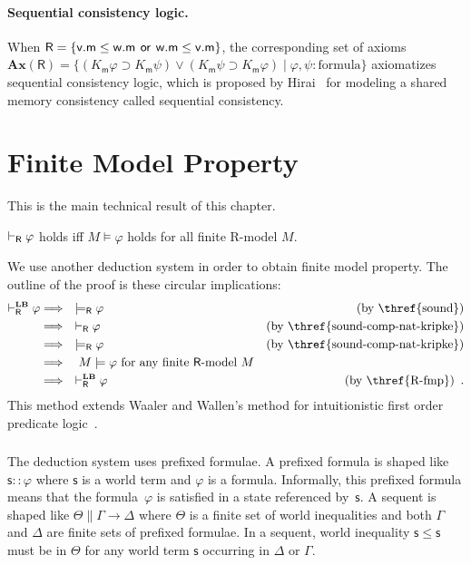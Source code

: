     \paragraph{Sequential consistency logic.}
    When $\mathsf R=\{\mathsf v.\mathsf m\le\mathsf w.\mathsf m\,\mathbin{\mathsf{or}}\, \mathsf
    w.\mathsf m\le \mathsf v.\mathsf m\}$,
    the corresponding set of axioms
    $\mathbf{Ax}(\mathsf R) = \{(K_{\mathsf m}\varphi\supset K_{\mathsf
    m}\psi)\vee(K_{\mathsf m}\psi\supset K_{\mathsf m}\varphi)\mid \varphi,
    \psi\colon\mbox{formula}\}$
    axiomatizes sequential consistency logic,
    which is proposed by Hirai~\cite{hirailpar} for modeling a shared memory consistency called sequential consistency.


  \section{Finite Model Property}
  \label{fmp-proof}

  This is the main technical result of this chapter.
  \begin{corollary}
   \label{thm:fmp}
   $\vdash_{\mathsf R}\varphi$ holds iff $M\models \varphi$ holds
   for all finite {\sf R}-model $M$.
  \end{corollary}

  We use another deduction system\,\LB\,in order to obtain finite model
  property.
  The outline of the proof is these circular implications:
  \begin{align*}
   \vdashRLB\varphi &\Longrightarrow \quad \models_{\mathsf R}\varphi\quad
   &(\mbox{by \thref{sound}})\\
   &\Longrightarrow \quad \vdash_{\mathsf R}\varphi &(\mbox{by
   \thref{sound-comp-nat-kripke}}) \\
   &\Longrightarrow\quad \modelsR\varphi &\mbox{(by \thref{sound-comp-nat-kripke})}\\
   &\Longrightarrow\quad M\models\varphi \mbox{ for any finite $\mathsf
   R$-model }M\\
   &\Longrightarrow\quad \vdashRLB\varphi & (\mbox{by
   \thref{R-fmp}})\enspace .
  \end{align*}
  This method extends Waaler
  and Wallen's method for intuitionistic first order predicate logic~\cite{waaler1999tableaux}.

   \subsubsection{\LB}

   The deduction system\,\LB\,uses prefixed formulae.  A
   prefixed formula is shaped like $\mathsf s::\varphi$ where $\mathsf s $
   is a world term and $\varphi$ is a formula.
   Informally, this prefixed formula means that the formula~$\varphi$ is
   satisfied in a state referenced by~$\mathsf s$.
   A sequent is shaped like
   $\Theta\parallel \Gamma\longrightarrow \Delta$ where
   $\Theta$ is a finite set of world inequalities and both
   $\Gamma$ and $\Delta$ are finite sets of prefixed formulae.
   In a sequent, world inequality
   $\mathsf s\le \mathsf s$ must be in $\Theta$
   for any world term $\mathsf s$ occurring in $\Delta$ or $\Gamma$.

